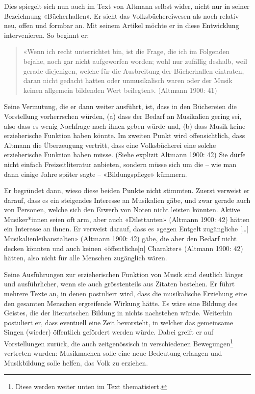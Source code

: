 \documentclass[a4paper,
fontsize=11pt,
oneside,
numbers=noperiodatend,
parskip=half-,
bibliography=totoc,
final
]{scrartcl}
\begin{document}
Dies spiegelt sich nun auch im Text von Altmann selbst wider, nicht nur
in seiner Bezeichnung «Bücherhallen». Er sieht das Volksbüchereiwesen
als noch relativ neu, offen und formbar an. Mit seinem Artikel möchte er
in diese Entwicklung intervenieren. So beginnt er:

\begin{quote}
«Wenn ich recht unterrichtet bin, ist die Frage, die ich im Folgenden
bejahe, noch gar nicht aufgeworfen worden; wohl nur zufällig deshalb,
weil gerade diejenigen, welche für die Ausbreitung der Bücherhallen
eintraten, daran nicht gedacht hatten oder unmusikalisch waren oder der
Musik keinen allgemein bildenden Wert beilegten». (Altmann 1900: 41)
\end{quote}

Seine Vermutung, die er dann weiter ausführt, ist, dass in den
Büchereien die Vorstellung vorherrschen würden, (a) dass der Bedarf an
Musikalien gering sei, also dass es wenig Nachfrage nach ihnen geben
würde und, (b) dass Musik keine erzieherische Funktion haben könnte. Im
zweiten Punkt wird offensichtlich, dass Altmann die Überzeugung
vertritt, dass eine Volksbücherei eine solche erzieherische Funktion
haben müsse. (Siehe explizit Altmann 1900: 42) Sie dürfe nicht einfach
Freizeitliteratur anbieten, sondern müsse sich um die -- wie man dann
einige Jahre später sagte -- «Bildungspflege» kümmern.

Er begründet dann, wieso diese beiden Punkte nicht stimmten. Zuerst
verweist er darauf, dass es ein steigendes Interesse an Musikalien gäbe,
und zwar gerade auch von Personen, welche sich den Erwerb von Noten
nicht leisten könnten. Aktive Musiker*innen seien oft arm, aber auch
«Dilettanten» (Altmann 1900: 42) hätten ein Interesse an ihnen. Er
verweist darauf, dass es «gegen Entgelt zugängliche {[}\ldots{]}
Musikalienleihanstalten» (Altmann 1900: 42) gäbe, die aber den Bedarf
nicht decken könnten und auch keinen «öffentliche{[}n{]} Charakter»
(Altmann 1900: 42) hätten, also nicht für alle Menschen zugänglich
wären.

Seine Ausführungen zur erzieherischen Funktion von Musik sind deutlich
länger und ausführlicher, wenn sie auch grösstenteils aus Zitaten
bestehen. Er führt mehrere Texte an, in denen postuliert wird, dass die
musikalische Erziehung eine den gesamten Menschen ergreifende Wirkung
hätte. Es wäre eine Bildung des Geistes, die der literarischen Bildung
in nichts nachstehen würde. Weiterhin postuliert er, dass eventuell eine
Zeit bevorsteht, in welcher das gemeinsame Singen (wieder) öffentlich
gefördert werden würde. Dabei greift er auf Vorstellungen zurück, die
auch zeitgenössisch in verschiedenen Bewegungen\footnote{Diese werden
  weiter unten im Text thematisiert.} vertreten wurden: Musikmachen
solle eine neue Bedeutung erlangen und Musikbildung solle helfen, das
Volk zu erziehen.
\end{document}
